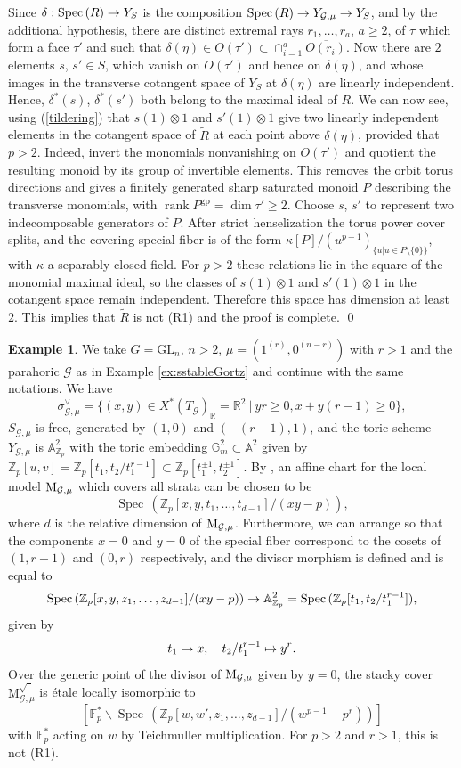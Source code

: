 \documentclass[reqno, 10pt]{amsart}
\makeatletter
\newcommand{\BA}{\ensuremath{\mathbb {A}}\xspace}
\newcommand{\BF}{\ensuremath{\mathbb {F}}\xspace}
\newcommand{\BG}{\ensuremath{\mathbb {G}}\xspace}
\newcommand{\BR}{\ensuremath{\mathbb {R}}\xspace}
\newcommand{\BZ}{\ensuremath{\mathbb {Z}}\xspace}
\newcommand{\CG}{\ensuremath{\mathcal {G}}\xspace}
\newcommand{\GL}{\mathrm{GL}}
\DeclareMathOperator{\rank}{rank}
\DeclareMathOperator{\Spec}{Spec\,}
\newcommand{\wt}{\widetilde}
\newcommand{\ov}{\overline}
\newcommand{\bs}{\backslash}
\theoremstyle{definition}
\newtheorem{example}[subsubsection]{Example}
\numberwithin{equation}{subsection}
\numberwithin{subsubsection}{subsection}
\renewcommand{\to}{%
   \ifbool{@display}{\longrightarrow}{\rightarrow}%
   }
\let\shortmapsto\mapsto
\renewcommand{\mapsto}{%
   \ifbool{@display}{\shortmapsto}{\shortmapsto}%
   }
\newcommand{\Mloc}{{\rm M}}
\newcommand{\Mlocrooto}{{\mathrm M}^{\sqrt{\phantom{a}}}}
\makeatother
\begin{document}
 Since $\delta: \Spec(R)\to Y_S$ is the composition $\Spec(R)\to Y_{\CG,\mu}\to Y_S$,  and by the additional hypothesis, there are distinct extremal rays $r_1,\ldots, r_a$, $a\geq 2$, of $\tau$ which form a face $\tau'$ and such that $\delta(\eta)\in O(\tau')\subset \cap_{i=1}^a\ov{O(r_i)}$.  Now there are  $2$ elements $s$, $s'\in S$, which vanish on $O(\tau')$ and hence on $\delta(\eta)$, and 
 whose images  in the  transverse cotangent space of $Y_S$ at $\delta(\eta)$ are linearly independent.
  Hence, $\delta^*(s)$, $\delta^*(s')$    both belong to the maximal ideal of $R$. 
  We can now see, using (\ref{tildering})  that $s(1)\otimes 1$ and $s'(1)\otimes 1$ give two linearly independent elements in the cotangent space of $\wt R$ at each point above $\delta(\eta)$, provided that $p>2$. 
   Indeed, invert the monomials nonvanishing on $O(\tau')$ and
quotient the resulting monoid by its group of invertible elements.
This removes the orbit torus directions and gives a finitely generated
sharp saturated monoid $P$ describing the transverse monomials, with
$\rank P^{\mathrm{gp}}=\dim\tau'\ge2$.
Choose $s$, $s'$ to represent two indecomposable generators of $P$.
After strict henselization the torus power cover splits, and the covering
special fiber is of the form $\kappa[P]/(u^{p-1})_{\{u|u\in P\setminus\{0\}\}}$, with $\kappa$ a separably closed field. For $p>2$ these relations
lie in the square of the monomial maximal ideal, so the classes of $s(1)\otimes 1$ and $s'(1)\otimes 1$  in the cotangent space
remain independent. Therefore this space has dimension at least $2$. This implies that $\wt R$ is not (R1) and the proof is complete.
 \qed


\begin{example}
We take $G=\GL_n$, $n>2$, $\mu=(1^{(r)}, 0^{(n-r)})$ with $r>1$ and the parahoric $\CG$ as in Example \ref{ex:sstableGortz} and continue 
with the same notations.
We have 
 \[
 \sigma^\vee_{\CG,\mu}=\{(x, y)\in X^*(T_\CG)_\BR=\BR^2\ |\  yr\geq 0, x+y(r-1)\geq 0\},
 \] 
$S_{\CG,\mu}$ is free, generated by $(1,0)$ and $(-(r-1), 1)$, and the toric scheme $Y_{\CG,\mu}$ is $\BA^2_{\BZ_p}$
with the toric embedding $\BG_m^2\subset \BA^2$ given by $\BZ_p[u,v]=\BZ_p[t_1, t_2/t_1^{r-1}]\subset \BZ_p[t_1^{\pm1}, t_2^{\pm 1}]$.
By \cite[Prop. 12.1]{HPR}, an affine chart for the local model $\Mloc_{\CG,\mu}$ which covers all strata can be chosen to be 
\[
\Spec(\BZ_p[x,y, t_1,\ldots , t_{d-1}]/(xy-p)),
\]
where $d$ is the relative dimension of $\Mloc_{\CG,\mu}$. 
Furthermore, we can arrange so that the components $x=0$ and $y=0$ of the special fiber correspond to the cosets of $(1, r-1)$ and $(0, r)$ respectively, and the divisor morphism is defined and is equal to
\[
\Spec(\BZ_p[x,y, z_1,\ldots , z_{d-1}]/(xy-p))\to  \BA^2_{\BZ_p}=\Spec(\BZ_p[t_1, t_2/t_1^{r-1}]), 
\]
given by
\[
t_1\mapsto x,\quad  t_2/t_1^{r-1}\mapsto y^r.
\]
Over the generic point of the divisor of $\Mloc_{\CG,\mu}$  given by $y=0$, the stacky cover $\Mlocrooto_{\CG,\mu}$
is \'etale locally isomorphic to 
\[
[\BF_p^*\bs \Spec(\BZ_p[w, w', z_1,\ldots , z_{d-1}]/(w^{p-1}-p^r))]
\]
with $\BF_p^*$ acting on $w$ by Teichmuller multiplication. For $p>2$ and $r>1$, this is not (R1).
\end{example}
\end{document}
